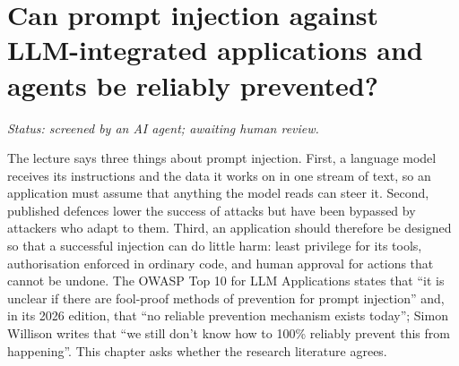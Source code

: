 %

\chapter{Can prompt injection against LLM-integrated applications and
  agents be reliably prevented?}
\label{prompt-injection:chapter}

\emph{Status: screened by an AI agent; awaiting human review.}

The lecture says three things about prompt injection. First, a language
model receives its instructions and the data it works on in one stream of
text, so an application must assume that anything the model reads can
steer it. Second, published defences lower the success of attacks but
have been bypassed by attackers who adapt to them. Third, an application
should therefore be designed so that a successful injection can do
little harm: least privilege for its tools, authorisation enforced in
ordinary code, and human approval for actions that cannot be undone.
The OWASP Top 10 for LLM Applications states that \enquote{it is unclear
if there are fool-proof methods of prevention for prompt
injection}\autocite{OWASP2025LLM} and, in its 2026 edition, that
\enquote{no reliable prevention mechanism exists
today}\autocite{OWASP2026LLM}; Simon Willison writes that \enquote{we
still don't know how to 100\% reliably prevent this from
happening}\autocite{Willison2025Trifecta}. This chapter asks whether the
research literature agrees.

